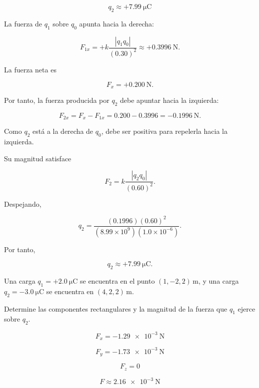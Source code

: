 \begin{respuesta}
\[
\boxed{q_2\approx+\SI{7.99}{\micro\coulomb}}
\]
\end{respuesta}

\begin{explicacion}
La fuerza de \(q_1\) sobre \(q_0\) apunta hacia la derecha:

\[
F_{1x}=+
k\frac{|q_1q_0|}{(0.30)^2}
\approx+\SI{0.3996}{\newton}.
\]

La fuerza neta es

\[
F_x=+\SI{0.200}{\newton}.
\]

Por tanto, la fuerza producida por \(q_2\) debe apuntar hacia la izquierda:

\[
F_{2x}=F_x-F_{1x}
=0.200-0.3996
=-\SI{0.1996}{\newton}.
\]

Como \(q_2\) está a la derecha de \(q_0\), debe ser positiva para repelerla
hacia la izquierda.

Su magnitud satisface

\[
F_2=k\frac{|q_2q_0|}{(0.60)^2}.
\]

Despejando,

\[
q_2=
\frac{(0.1996)(0.60)^2}
{(8.99\times10^9)(1.0\times10^{-6})}.
\]

Por tanto,

\[
\boxed{q_2\approx+\SI{7.99}{\micro\coulomb}}.
\]
\end{explicacion}


\begin{ejercicio}
Una carga \(q_1=+\SI{2.0}{\micro\coulomb}\) se encuentra en el punto
\((1,-2,2)\,\si{\metre}\), y una carga
\(q_2=-\SI{3.0}{\micro\coulomb}\) se encuentra en
\((4,2,2)\,\si{\metre}\).

Determine las componentes rectangulares y la magnitud de la fuerza que
\(q_1\) ejerce sobre \(q_2\).
\end{ejercicio}

\begin{respuesta}
\[
\boxed{F_x=-\SI{1.29e-3}{\newton}}
\]

\[
\boxed{F_y=-\SI{1.73e-3}{\newton}}
\]

\[
\boxed{F_z=0}
\]

\[
\boxed{F\approx\SI{2.16e-3}{\newton}}
\]
\end{respuesta}

